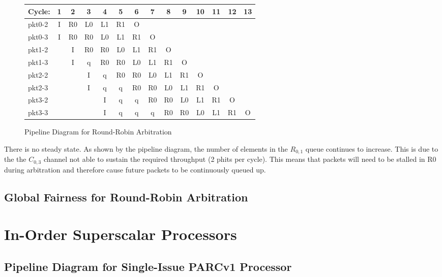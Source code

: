 \documentclass[10pt]{article}
\begin{document}
\begin{figure}[H]
\centering
{\setlength{\tabcolsep}{2pt}
\begin{tabular}{|l|c|c|c|c|c|c|c|c|c|c|c|c|c|}
\hline
Cycle: & 1  & 2  & 3  & 4  & 5  & 6  & 7  & 8  & 9  & 10 & 11 & 12 & 13 \\ \hline
pkt0-2 & I  & R0 & L0 & L1 & R1 & O  &    &    &    &    &    &    &    \\ \hline
pkt0-3 & I  & R0 & R0 & L0 & L1 & R1 & O  &    &    &    &    &    &    \\ \hline
pkt1-2 &    & I  & R0 & R0 & L0 & L1 & R1 & O  &    &    &    &    &    \\ \hline
pkt1-3 &    & I  & q  & R0 & R0 & L0 & L1 & R1 & O  &    &    &    &    \\ \hline
pkt2-2 &    &    & I  & q  & R0 & R0 & L0 & L1 & R1 & O  &    &    &    \\ \hline
pkt2-3 &    &    & I  & q  & q  & R0 & R0 & L0 & L1 & R1 & O  &    &    \\ \hline
pkt3-2 &    &    &    & I  & q  & q  & R0 & R0 & L0 & L1 & R1 & O  &    \\ \hline
pkt3-3 &    &    &    & I  & q  & q  & q  & R0 & R0 & L0 & L1 & R1 & O  \\ \hline
\end{tabular}
}
\caption{Pipeline Diagram for Round-Robin Arbitration}
\end{figure}
There is no steady state. As shown by the pipeline diagram, the number of elements in the $R_{0,1}$ queue continues to increase. This is due to the the $C_{0,3}$ channel not able to sustain the required throughput (2 phits per cycle). This means that packets will need to be stalled in R0 during arbitration and therefore cause future packets to be continuously queued up. 

\subsection{Global Fairness for Round-Robin Arbitration}


\cleardoublepage
\section{In-Order Superscalar Processors}

\subsection{Pipeline Diagram for Single-Issue PARCv1 Processor}
\end{document}
